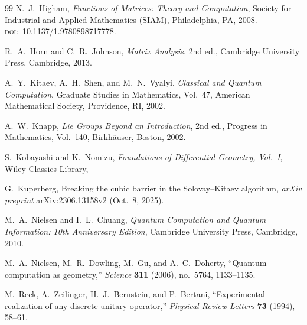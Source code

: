 \documentclass{article}%
\theoremstyle{definition}
\numberwithin{equation}{section}
\begin{document}
\begin{thebibliography}{99}
N.~J.~Higham,
\newblock \emph{Functions of Matrices: Theory and Computation},
\newblock Society for Industrial and Applied Mathematics (SIAM), Philadelphia, PA, 2008.
\newblock \textsc{doi}:~10.1137/1.9780898717778.

R.~A.~Horn and C.~R.~Johnson,
\newblock \emph{Matrix Analysis},
\newblock 2nd ed., Cambridge University Press, Cambridge, 2013.

A.~Y.~Kitaev, A.~H.~Shen, and M.~N.~Vyalyi,
\newblock \emph{Classical and Quantum Computation},
\newblock Graduate Studies in Mathematics, Vol.~47,
American Mathematical Society, Providence, RI, 2002.

A.~W.~Knapp,
\newblock \emph{Lie Groups Beyond an Introduction},
\newblock 2nd ed., Progress in Mathematics, Vol.~140, Birkh{\"a}user, Boston, 2002.

S.~Kobayashi and K.~Nomizu,
\newblock \emph{Foundations of Differential Geometry, Vol.~I},
\newblock Wiley Classics Library,

G.~Kuperberg,
\newblock Breaking the cubic barrier in the Solovay--Kitaev algorithm,
\newblock \emph{arXiv preprint} arXiv:2306.13158v2 (Oct.~8, 2025).

M.~A.~Nielsen and I.~L.~Chuang,
\newblock \emph{Quantum Computation and Quantum Information: 10th Anniversary Edition},
\newblock Cambridge University Press, Cambridge, 2010.

M.~A.~Nielsen, M.~R.~Dowling, M.~Gu, and A.~C.~Doherty,
\newblock ``Quantum computation as geometry,''
\newblock \emph{Science} \textbf{311} (2006), no.~5764, 1133--1135.

M.~Reck, A.~Zeilinger, H.~J.~Bernstein, and P.~Bertani,
\newblock ``Experimental realization of any discrete unitary operator,''
\newblock \emph{Physical Review Letters} \textbf{73} (1994), 58--61.

\end{thebibliography}
\end{document}
